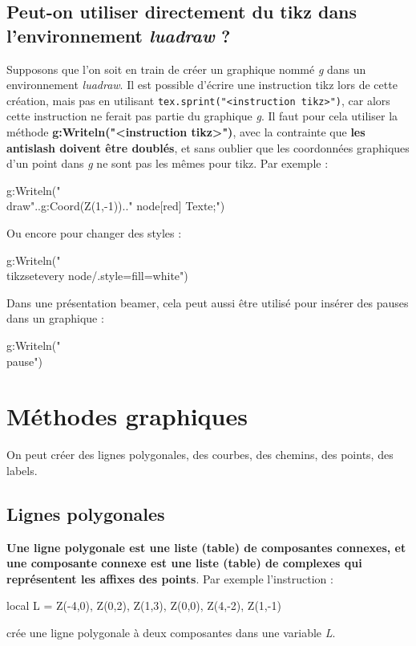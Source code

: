 \subsection{Peut-on utiliser directement du tikz dans l'environnement \emph{luadraw} ?}

Supposons que l'on soit en train de créer un graphique nommé \emph{g} dans un environnement \emph{luadraw}. Il est possible d'écrire une instruction tikz lors de cette création, mais pas en utilisant \verb|tex.sprint("<instruction tikz>")|, car alors cette instruction ne ferait pas partie du graphique \emph{g}. Il faut pour cela utiliser la méthode \textbf{g:Writeln("<instruction tikz>")}, avec la contrainte que \textbf{les antislash doivent être doublés}, et sans oublier que les coordonnées graphiques d'un point dans \emph{g} ne sont pas les mêmes pour tikz. Par exemple : 
\begin{Luacode}
g:Writeln("\\draw"..g:Coord(Z(1,-1)).." node[red] {Texte};")
\end{Luacode}

Ou encore pour changer des styles :
\begin{Luacode}
g:Writeln("\\tikzset{every node/.style={fill=white}}")
\end{Luacode}

Dans une présentation beamer, cela peut aussi être utilisé pour insérer des pauses dans un graphique :
\begin{Luacode}
g:Writeln("\\pause")
\end{Luacode}  

\section{Méthodes graphiques}

On peut créer des lignes polygonales, des courbes, des chemins, des points, des labels.


\subsection{Lignes polygonales}

\textbf{Une ligne polygonale est une liste (table) de composantes connexes, et une composante connexe est une liste (table) de complexes qui représentent les affixes des points}. Par exemple l'instruction :
\begin{Luacode}
local L = { {Z(-4,0), Z(0,2), Z(1,3)}, {Z(0,0), Z(4,-2), Z(1,-1)} }
\end{Luacode}
crée une ligne polygonale à deux composantes dans une variable \emph{L}.

